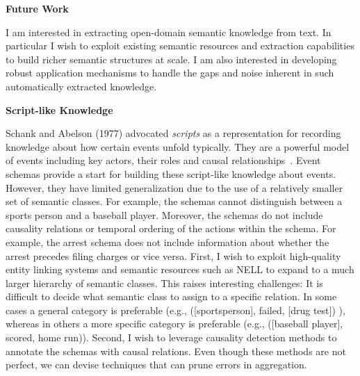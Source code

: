 \documentclass[a4paper,11pt,onecolumn]{article}
\newcommand{\eat}[1]{}
\begin{document}
{\bf Future Work}

I am interested in extracting open-domain semantic knowledge from text. In particular I wish to exploit existing semantic resources and extraction capabilities to build richer semantic structures at scale. I am also interested in developing robust application mechanisms to handle the gaps and noise inherent in such automatically extracted knowledge.

{\bf Script-like Knowledge}

Schank and Abelson (1977) advocated {\em scripts} as a representation for recording knowledge about how certain events unfold typically. They are a powerful model of events including key actors, their roles and causal relationships~\cite{schank-scripts75}. Event schemas provide a start for building these script-like knowledge about events. However, they have limited generalization due to the use of a relatively smaller set of semantic classes. For example, the schemas cannot distinguish between a sports person and a baseball player. Moreover, the schemas do not include causality relations or temporal ordering of the actions within the schema. For example, the arrest schema does not  include information about whether the arrest precedes filing charges or vice versa. First, I wish to exploit high-quality entity linking systems and semantic resources such as NELL to expand to a much larger hierarchy of semantic classes. This raises interesting challenges: It is difficult to decide what semantic class to assign to a specific relation. In some cases a general category is preferable (e.g., ([sportsperson], failed, [drug test]) ), whereas in others a more specific category is preferable (e.g., ([baseball player], scored, home run)).  Second, I wish to leverage causality detection methods to annotate the schemas with causal relations. Even though these methods are not perfect, we can devise techniques that can prune errors in aggregation. 

\eat{Script like knowledge provide powerful models of events at discourse level by including key actors, their roles and causal relationships~\cite{schank-scripts75}. Rel-grams and schemas provide a start. However, their generalization is somewhat limited due to use of a limited set of semantic classes chosen in an ad-hoc fashion. Further, they do not include other valuable discourse relations such as causality and temporal ordering. First, I wish to exploit high-quality entity linking systems and semantic resources such as NELL to expand to a much larger hierarchy of semantic classes. This raises interesting challenges. For example, it is difficult to decide what semantic class to assign to a specific relation. In some cases a general category is preferable (e.g., ([sportsperson], failed, [drug test]) ), whereas in others a more specific category is preferable (e.g., ([baseball player], scored, home run)).  Second, I wish to leverage causality detection methods to annotate the schemas with causal relations. Even though these methods are not perfect, we can devise techniques that can prune errors in aggregation. }
\end{document}

